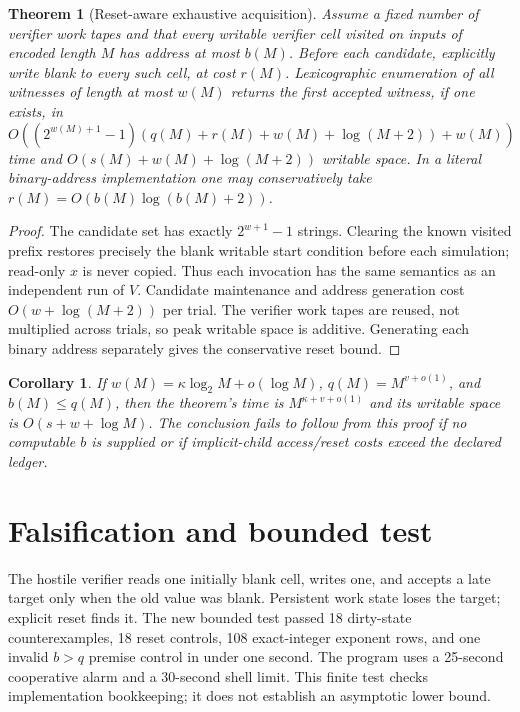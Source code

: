 \documentclass[11pt]{article}
\newtheorem{theorem}{Theorem}
\newtheorem{corollary}{Corollary}
\begin{document}
\begin{theorem}[Reset-aware exhaustive acquisition]
Assume a fixed number of verifier work tapes and that every writable verifier
cell visited on inputs of encoded length $M$ has address at most $b(M)$.
Before each candidate, explicitly write blank to every such cell, at cost
$r(M)$.  Lexicographic enumeration of all witnesses of length at most $w(M)$
returns the first accepted witness, if one exists, in
\[
 O\!\left((2^{w(M)+1}-1)
   (q(M)+r(M)+w(M)+\log(M+2))+w(M)\right)
\]
time and $O(s(M)+w(M)+\log(M+2))$ writable space.  In a literal binary-address
implementation one may conservatively take
$r(M)=O(b(M)\log(b(M)+2))$.
\end{theorem}
\begin{proof}
The candidate set has exactly $2^{w+1}-1$ strings.  Clearing the known visited
prefix restores precisely the blank writable start condition before each
simulation; read-only $x$ is never copied.  Thus each invocation has the same
semantics as an independent run of $V$.  Candidate maintenance and address
generation cost $O(w+\log(M+2))$ per trial.  The verifier work tapes are reused,
not multiplied across trials, so peak writable space is additive.  Generating
each binary address separately gives the conservative reset bound.
\end{proof}

\begin{corollary}
If $w(M)=\kappa\log_2M+o(\log M)$,
$q(M)=M^{v+o(1)}$, and $b(M)\le q(M)$, then the theorem's time is
$M^{\kappa+v+o(1)}$ and its writable space is
$O(s+w+\log M)$.  The conclusion fails to follow from this proof if no
computable $b$ is supplied or if implicit-child access/reset costs exceed the
declared ledger.
\end{corollary}

\section*{Falsification and bounded test}
The hostile verifier reads one initially blank cell, writes one, and accepts a
late target only when the old value was blank.  Persistent work state loses
the target; explicit reset finds it.  The new bounded test passed 18 dirty-state
counterexamples, 18 reset controls, 108 exact-integer exponent rows, and one
invalid $b>q$ premise control in under one second.  The program uses a
25-second cooperative alarm and a 30-second shell limit.  This finite test
checks implementation bookkeeping; it does not establish an asymptotic lower
bound.
\end{document}
